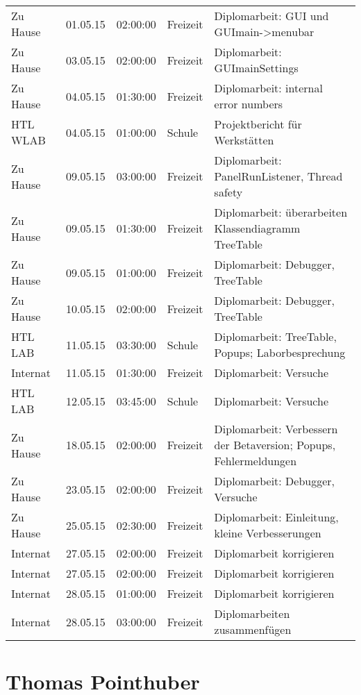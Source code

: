 \begin{small}
\begin{longtable}{ p{} p{} p{} p{} p{}}
Zu Hause	& 01.05.15	& 02:00:00	& Freizeit	& Diplomarbeit: GUI und GUImain->menubar \\
Zu Hause	& 03.05.15	& 02:00:00	& Freizeit	& Diplomarbeit: GUImainSettings \\
Zu Hause	& 04.05.15	& 01:30:00	& Freizeit	& Diplomarbeit: internal error numbers \\
HTL WLAB	& 04.05.15	& 01:00:00	& Schule	& Projektbericht f\"ur Werkst\"atten \\
Zu Hause	& 09.05.15	& 03:00:00	& Freizeit	& Diplomarbeit: PanelRunListener, Thread safety \\
Zu Hause	& 09.05.15	& 01:30:00	& Freizeit	& Diplomarbeit: \"uberarbeiten Klassendiagramm TreeTable \\
Zu Hause	& 09.05.15	& 01:00:00	& Freizeit	& Diplomarbeit: Debugger, TreeTable \\
Zu Hause	& 10.05.15	& 02:00:00	& Freizeit	& Diplomarbeit: Debugger, TreeTable \\
HTL LAB	& 11.05.15	& 03:30:00	& Schule	& Diplomarbeit: TreeTable, Popups; Laborbesprechung \\
Internat	& 11.05.15	& 01:30:00	& Freizeit	& Diplomarbeit: Versuche \\
HTL LAB	& 12.05.15	& 03:45:00	& Schule	& Diplomarbeit: Versuche \\
Zu Hause	& 18.05.15	& 02:00:00	& Freizeit	& Diplomarbeit: Verbessern der Betaversion; Popups, Fehlermeldungen \\
Zu Hause	& 23.05.15	& 02:00:00	& Freizeit	& Diplomarbeit: Debugger, Versuche \\
Zu Hause	& 25.05.15	& 02:30:00	& Freizeit	& Diplomarbeit: Einleitung, kleine Verbesserungen \\
Internat	& 27.05.15	& 02:00:00	& Freizeit	& Diplomarbeit korrigieren \\
Internat	& 27.05.15	& 02:00:00	& Freizeit	& Diplomarbeit korrigieren \\
Internat	& 28.05.15	& 01:00:00	& Freizeit	& Diplomarbeit korrigieren \\
Internat	& 28.05.15	& 03:00:00	& Freizeit	& Diplomarbeiten zusammenf\"ugen \\
 \end{longtable}
\end{small}
\fi

\ifthomas
\section{Thomas Pointhuber}

